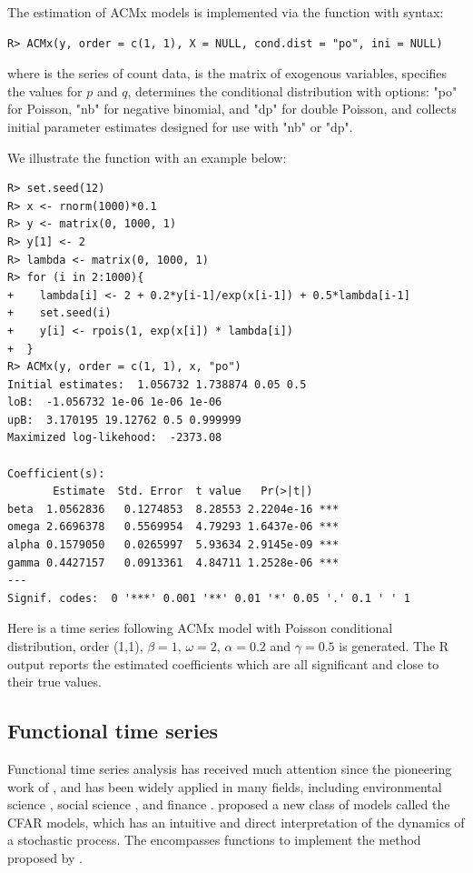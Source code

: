 The estimation of ACMx models is implemented via the function  with syntax:
\begin{verbatim}
R> ACMx(y, order = c(1, 1), X = NULL, cond.dist = "po", ini = NULL)
\end{verbatim}
where  is the series of count data,  is the matrix of exogenous variables,  specifies the values for $p$ and $q$,  determines the conditional distribution with options: "po" for Poisson, "nb" for negative binomial, and "dp" for double Poisson,
and  collects initial parameter estimates designed for use with "nb" or "dp".


We illustrate the function  with an example below:
\begin{verbatim}
R> set.seed(12)
R> x <- rnorm(1000)*0.1
R> y <- matrix(0, 1000, 1)
R> y[1] <- 2
R> lambda <- matrix(0, 1000, 1)
R> for (i in 2:1000){
+    lambda[i] <- 2 + 0.2*y[i-1]/exp(x[i-1]) + 0.5*lambda[i-1]
+    set.seed(i)
+    y[i] <- rpois(1, exp(x[i]) * lambda[i])
+  }
R> ACMx(y, order = c(1, 1), x, "po")
Initial estimates:  1.056732 1.738874 0.05 0.5 
loB:  -1.056732 1e-06 1e-06 1e-06 
upB:  3.170195 19.12762 0.5 0.999999 
Maximized log-likehood:  -2373.08 

Coefficient(s):
       Estimate  Std. Error  t value   Pr(>|t|)    
beta  1.0562836   0.1274853  8.28553 2.2204e-16 ***
omega 2.6696378   0.5569954  4.79293 1.6437e-06 ***
alpha 0.1579050   0.0265997  5.93634 2.9145e-09 ***
gamma 0.4427157   0.0913361  4.84711 1.2528e-06 ***
---
Signif. codes:  0 '***' 0.001 '**' 0.01 '*' 0.05 '.' 0.1 ' ' 1
\end{verbatim}

Here is a time series following ACMx model with Poisson conditional distribution, order (1,1), $\beta=1$, $\omega=2$, $\alpha=0.2$ and $\gamma=0.5$ is generated. The {R} output reports the estimated coefficients which are all significant and close to their true values.

\subsection{Functional time series}
Functional time series analysis has received much attention since the pioneering work of \cite{bosq2000}, and has been widely applied in many fields, including environmental science \citep{hormann2010}, social science \citep{hyndman2000}, and finance \citep{diebold2006,horvath2013}. \cite{liu2016functional} proposed a new class of models called the CFAR models, which has an intuitive
and direct interpretation of the dynamics of a stochastic process. The
 encompasses functions to implement the method proposed by \cite{liu2016functional}.


